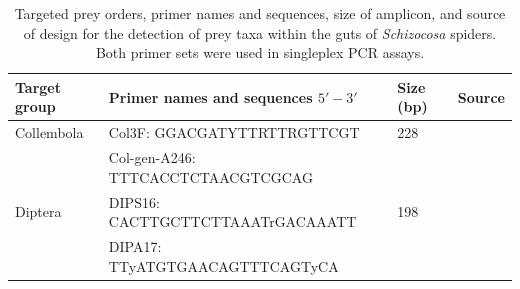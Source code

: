 \documentclass[smallextended]{svjour3}
\begin{document}
\begin{table}
  \label{tab:s1}
  \centering
  \begin{tabular}{llll}
    \hline
    \textbf{Target group} & \textbf{Primer names and sequences} $5'-3'$ & \textbf{Size (bp)} & \textbf{Source}\\
    \hline
    Collembola & Col3F: GGACGATYTTRTTRGTTCGT & 228 & \citet{Sint:2012} \\
    & Col-gen-A246: TTTCACCTCTAACGTCGCAG & & \\
    Diptera & DIPS16: CACTTGCTTCTTAAATrGACAAATT & 198 & \citet{Eitzinger:2014} \\
    & DIPA17: TTyATGTGAACAGTTTCAGTyCA &  & \\
  \end{tabular}
  \caption{Targeted prey orders, primer names and sequences, size of amplicon, and source of design for the detection of prey taxa within the guts of \textit{Schizocosa} spiders.  Both primer sets were used in singleplex PCR assays.}
\end{table}
\end{document}

